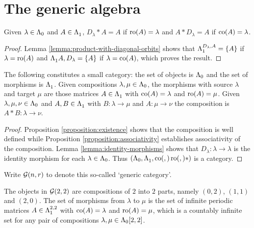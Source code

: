 \documentclass[a4paper, 11pt]{report}
\begin{document}
\section{The generic algebra}{\color{gray}

\begin{lemma}\label{lemma:identity-morphisms}
Given $\lambda\in\compositions$ and $A\in\matrices$, $D_\lambda\ast A = A$ if $\ro{A}=\lambda$ and $A\ast D_\lambda = A$ if $\co{A}=\lambda$.
\end{lemma}
\begin{proof}
Lemma \ref{lemma:product-with-diagonal-orbits} shows that $\matrices[D_\lambda,A] = \{A\}$ if $\lambda=\ro{A}$ and $\matrices{A,D_\lambda} = \{A\}$ if $\lambda=\co{A}$, which proves the result. 
\end{proof}

\begin{theorem}\label{thm:generic-category}
The following constitutes a small category: the set of objects is $\compositions$ and the set of morphisms is $\matrices$. Given compositions $\lambda,\mu\in\compositions$, the morphisms with source $\lambda$ and target $\mu$ are those matrices $A\in\matrices$ with $\co{A}=\lambda$ and $\ro{A}=\mu$. Given $\lambda,\mu,\nu\in\compositions$ and $A,B\in\matrices$ with $B\colon\lambda\to\mu$ and $A\colon\mu\to\nu$ the composition is $A\ast B\colon\lambda\to\nu$.
\end{theorem}

\begin{proof}
Proposition \ref{proposition:existence} shows that the composition is well defined while Proposition \ref{proposition:associativity} establishes associativity of the composition. Lemma \ref{lemma:identity-morphisms} shows that $D_\lambda\colon\lambda\to\lambda$ is the identity morphism for each $\lambda\in\compositions$. Thus $(\compositions,\matrices,\co,\ro,\ast)$ is a category.
\end{proof}

Write $\gcat$ to denote this so-called `generic category'.

\begin{example}
The objects in $\gcat[2,2]$ are compositions of $2$ into $2$ parts, namely $(0,2)$, $(1,1)$ and $(2,0)$. The set of morphisms from $\lambda$ to $\mu$ is the set of infinite periodic matrices $A\in\matrices[2,2]$ with $\co{A}=\lambda$ and $\ro{A}=\mu$, which is a countably infinite set for any pair of compositions $\lambda,\mu\in\compositions[2,2]$.
\end{example}

}
\end{document}
